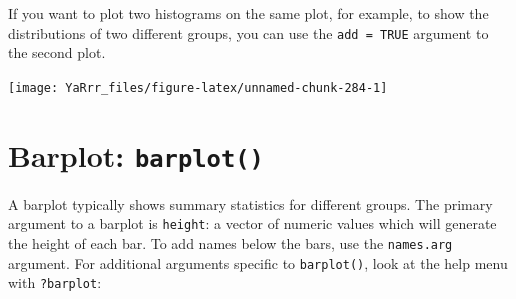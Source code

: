 \documentclass[]{book}
\newenvironment{Shaded}{\begin{snugshade}}{\end{snugshade}}
\newcommand{\KeywordTok}[1]{\textcolor[rgb]{0.13,0.29,0.53}{\textbf{#1}}}
\newcommand{\DataTypeTok}[1]{\textcolor[rgb]{0.13,0.29,0.53}{#1}}
\newcommand{\DecValTok}[1]{\textcolor[rgb]{0.00,0.00,0.81}{#1}}
\newcommand{\StringTok}[1]{\textcolor[rgb]{0.31,0.60,0.02}{#1}}
\newcommand{\CommentTok}[1]{\textcolor[rgb]{0.56,0.35,0.01}{\textit{#1}}}
\newcommand{\OtherTok}[1]{\textcolor[rgb]{0.56,0.35,0.01}{#1}}
\newcommand{\OperatorTok}[1]{\textcolor[rgb]{0.81,0.36,0.00}{\textbf{#1}}}
\newcommand{\NormalTok}[1]{#1}
\theoremstyle{definition}
\theoremstyle{definition}
\theoremstyle{remark}
\begin{document}
If you want to plot two histograms on the same plot, for example, to
show the distributions of two different groups, you can use the
\texttt{add = TRUE} argument to the second plot.

\begin{Shaded}
\end{Shaded}

\begin{center}\texttt{[image: YaRrr\_files/figure-latex/unnamed-chunk-284-1]} \end{center}

\section{\texorpdfstring{Barplot:
\texttt{barplot()}}{Barplot: barplot()}}\label{barplot-barplot}

A barplot typically shows summary statistics for different groups. The
primary argument to a barplot is \texttt{height}: a vector of numeric
values which will generate the height of each bar. To add names below
the bars, use the \texttt{names.arg} argument. For additional arguments
specific to \texttt{barplot()}, look at the help menu with
\texttt{?barplot}:
\end{document}
